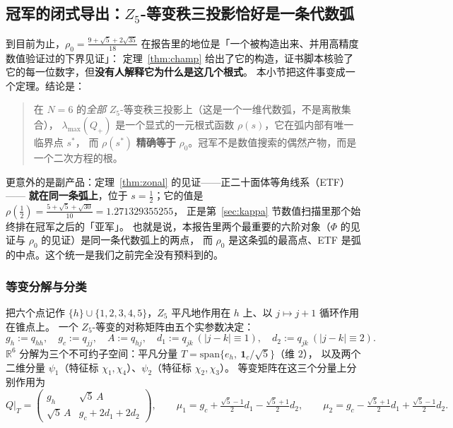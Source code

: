 \documentclass[UTF8,11pt]{ctexart}
\theoremstyle{definition}
\newcommand{\R}{\mathbb{R}}
\newcommand{\one}{\mathbf{1}}
\begin{document}
\subsection{冠军的闭式导出：$Z_5$-等变秩三投影恰好是一条代数弧}\label{sec:conefamily}

到目前为止，$\rho_0=\frac{9+\sqrt5+2\sqrt{35}}{18}$ 在报告里的地位是「一个被构造出来、并用高精度数值验证过的下界见证」：
定理~\ref{thm:champ} 给出了它的构造，证书脚本核验了它的每一位数字，但\textbf{没有人解释它为什么是这几个根式}。
本小节把这件事变成一个定理。结论是：

\begin{quote}\small
在 $N=6$ 的\emph{全部} $Z_5$-等变秩三投影上（这是一个一维代数弧，不是离散集合），
$\lambda_{\max}(Q_+)$ 是一个显式的一元根式函数 $\rho(s)$，它在弧内部有唯一临界点 $s^*$，
而 $\rho(s^*)$ \textbf{精确等于} $\rho_0$。冠军不是数值搜索的偶然产物，而是一个二次方程的根。
\end{quote}

更意外的是副产品：定理~\ref{thm:zonal} 的见证——正二十面体等角线系（ETF）——
\textbf{就在同一条弧上}，位于 $s=\frac12$；它的值是 $\rho(\frac12)=\frac{5+\sqrt5+\sqrt{30}}{10}=1.271329355255$，
正是第~\ref{sec:kappa} 节数值扫描里那个始终排在冠军之后的「亚军」。
也就是说，本报告里两个最重要的六阶对象（$\Phi$ 的见证与 $\rho_0$ 的见证）是同一条代数弧上的两点，
而 $\rho_0$ 是这条弧的最高点、ETF 是弧的中点。这个统一是我们之前完全没有预料到的。

\subsubsection*{等变分解与分类}

把六个点记作 $\{h\}\cup\{1,2,3,4,5\}$，$Z_5$ 平凡地作用在 $h$ 上、以 $j\mapsto j+1$ 循环作用在锥点上。
一个 $Z_5$-等变的对称矩阵由五个实参数决定：
\[
g_h:=q_{hh},\quad g_c:=q_{jj},\quad A:=q_{hj},\quad d_1:=q_{jk}\ (|j-k|\equiv1),\quad
d_2:=q_{jk}\ (|j-k|\equiv2).
\]
$\R^6$ 分解为三个不可约子空间：平凡分量 $T=\mathrm{span}\{e_h,\ \one_c/\sqrt5\}$（维 $2$），
以及两个二维分量 $\psi_1$（特征标 $\chi_1,\chi_4$）、$\psi_2$（特征标 $\chi_2,\chi_3$）。
等变矩阵在这三个分量上分别作用为
\begin{equation}\label{eq:isoT}
Q\big|_T=\begin{pmatrix} g_h & \sqrt5\,A\\[2pt] \sqrt5\,A & g_c+2d_1+2d_2\end{pmatrix},\qquad
\mu_1=g_c+\tfrac{\sqrt5-1}2d_1-\tfrac{\sqrt5+1}2d_2,\qquad
\mu_2=g_c-\tfrac{\sqrt5+1}2d_1+\tfrac{\sqrt5-1}2d_2 .
\end{equation}
\end{document}
